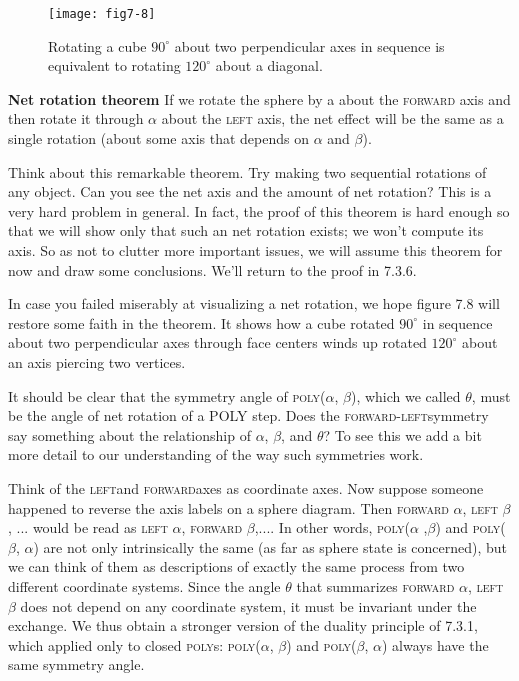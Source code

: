 \documentclass{book}
\begin{document}
\begin{figure}
\begin{center}
\texttt{[image: fig7-8]}
\caption{Rotating a cube $90^{\circ}$ about two perpendicular axes in sequence is equivalent to rotating $120^{\circ}$ about a diagonal.}
\end{center}
\end{figure}

\textbf{Net rotation theorem} If we rotate the sphere by a about the \textsc{forward}
axis and then rotate it through $\alpha$ about the \textsc{left} axis, the net effect will
be the same as a single rotation (about some axis that depends on $\alpha$ and $\beta$).

Think about this remarkable theorem. Try making two sequential
rotations of any object. Can you see the net axis and the amount of net
rotation? This is a very hard problem in general. In fact, the proof of
this theorem is hard enough so that we will show only that such an net
rotation exists; we won't compute its axis. So as not to clutter more
important issues, we will assume this theorem for now and draw some
conclusions. We'll return to the proof in 7.3.6.

In case you failed miserably at visualizing a net rotation, we hope
figure 7.8 will restore some faith in the theorem. It shows how a cube
rotated $90^{\circ}$ in sequence about two perpendicular axes through face centers winds up rotated $120^{\circ}$ about an axis piercing two vertices.

It should be clear that the symmetry angle of \textsc{poly}($\alpha$, $\beta$), which we
called $\theta$, must be the angle of net rotation of a POLY step. Does the
\textsc{forward-}\textsc{left}symmetry say something about the relationship of $\alpha$, $\beta$,
and $\theta$? To see this we add a bit more detail to our understanding of the
way such symmetries work.

Think of the \textsc{left}and \textsc{forward}axes as coordinate axes. Now suppose
someone happened to reverse the axis labels on a sphere diagram. Then
\textsc{forward} $\alpha$, \textsc{left} $\beta$, ... would be read as \textsc{left} $\alpha$, \textsc{forward} $\beta$,.... 
In other words, \textsc{poly}($\alpha$ ,$\beta$) and \textsc{poly}($\beta$, $\alpha$) are not only intrinsically the
same (as far as sphere state is concerned), but we can think of them as
descriptions of exactly the same process from two different coordinate
systems. Since the angle $\theta$ that summarizes \textsc{forward} $\alpha$, \textsc{left} $\beta$ does
not depend on any coordinate system, it must be invariant under the
exchange. We thus obtain a stronger version of the duality principle of
7.3.1, which applied only to closed \textsc{poly}s:
\textsc{poly}($\alpha$, $\beta$) and \textsc{poly}($\beta$, $\alpha$) always have the same symmetry angle.
\end{document}
